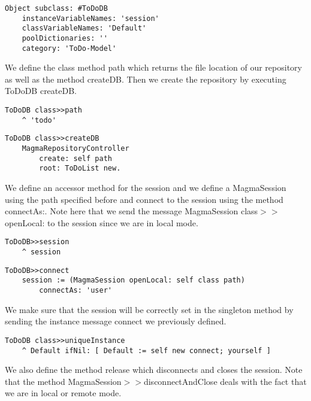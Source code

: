 \documentclass[a4paper,10pt,twoside]{book}
\newcommand{\ct}[1]{{\small\ttfamily\textup{#1}}}
\begin{document}
\begin{lstlisting}
Object subclass: #ToDoDB
    instanceVariableNames: 'session'
    classVariableNames: 'Default'
    poolDictionaries: ''
    category: 'ToDo-Model'
\end{lstlisting}

We define the class method \ct{path} which returns the file location of our repository as well as the method \ct{createDB}. Then we create the repository by executing \ct{ToDoDB createDB}.

\begin{lstlisting}
ToDoDB class>>path
    ^ 'todo'
\end{lstlisting}

\begin{lstlisting}
ToDoDB class>>createDB
    MagmaRepositoryController
        create: self path
        root: ToDoList new.
\end{lstlisting}

We define an accessor method for the session and we define a \ct{MagmaSession} using the path specified before and connect to the session using the method \ct{connectAs:}. Note here that we send the message \ct{MagmaSession class$>$$>$openLocal:} to the session since we are in local mode.

\begin{lstlisting}
ToDoDB>>session
    ^ session
\end{lstlisting}

\begin{lstlisting}
ToDoDB>>connect
    session := (MagmaSession openLocal: self class path)
        connectAs: 'user'
\end{lstlisting}

We make sure that the session will be correctly set in the singleton method by sending the instance message \ct{connect} we previously defined.

\begin{lstlisting}
ToDoDB class>>uniqueInstance
    ^ Default ifNil: [ Default := self new connect; yourself ]
\end{lstlisting}

We also define the method \ct{release} which disconnects and closes the session. Note that the method \ct{MagmaSession$>$$>$disconnectAndClose} deals with the fact that we are in local or remote mode.
\end{document}
